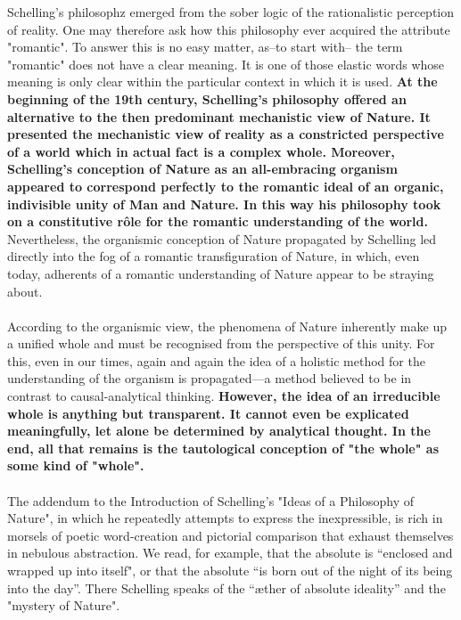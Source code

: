 \documentclass[10pt]{article}
\begin{document}
            \indent Schelling's philosophz emerged from the sober logic of the rationalistic perception of reality. One may therefore ask how this philosophy ever acquired the attribute "romantic". To answer this is no easy matter, as--to start with-- the term "romantic" does not have a clear meaning. It is one of those elastic words whose meaning is only clear within the particular context in which it is used. \textbf{At the beginning of the 19th century, Schelling's philosophy offered an alternative to the then predominant mechanistic view of Nature. It presented the mechanistic view of reality as a constricted perspective of a world which in actual fact is a complex whole. Moreover, Schelling's conception of Nature as an all-embracing organism appeared to correspond perfectly to the romantic ideal of an organic, indivisible unity of Man and Nature. In this way his philosophy took on a constitutive rôle for the romantic understanding of the world.} Nevertheless, the organismic conception of Nature propagated by Schelling led directly into the fog of a romantic transfiguration of Nature, in which, even today, adherents of a romantic understanding of Nature appear to be straying about.
            \\
            \\
            According to the organismic view, the phenomena of Nature inherently make up a unified whole and must be recognised from the perspective of this unity. For this, even in our times, again and again the idea of a holistic method for the understanding of the organism is propagated—a method believed to be in contrast to causal-analytical thinking. \textbf{However, the idea of an irreducible whole is anything but transparent. It cannot even be explicated meaningfully, let alone be determined by analytical thought. In the end, all that remains is the tautological conception of "the whole" as some kind of "whole".}
            \\
            \\
            The addendum to the Introduction of Schelling's "Ideas of a Philosophy of Nature", in which he repeatedly attempts to express the inexpressible, is rich in morsels of poetic word-creation and pictorial comparison that exhaust themselves in nebulous abstraction. We read, for example, that the absolute is “enclosed and wrapped up into itself", or that the absolute “is born out of the night of its being into the day”. There Schelling speaks of the “æther of absolute ideality” and the "mystery of Nature".
            \\
\end{document}
